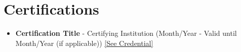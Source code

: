 \documentclass[letterpaper,11pt]{article}
\begin{document}
\section{Certifications}
\begin{itemize}[leftmargin=0.15in, label={}]
    \item\small{
        \textbf{Certification Title} - Certifying Institution (Month/Year - Valid until Month/Year (if applicable)) \href{https:///www.google.com}{[See Credential]} 
    }
    \vspace{-4pt}
\end{itemize}

\end{document}
